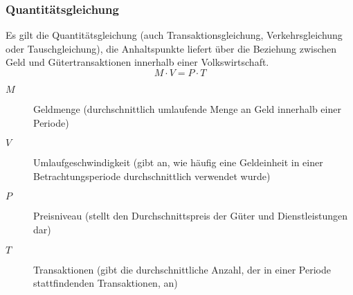 \subsubsection{Quantitätsgleichung}
Es gilt die Quantitätsgleichung (auch Transaktionsgleichung, Verkehrsgleichung oder Tauschgleichung), die Anhaltspunkte liefert 
über die Beziehung zwischen Geld und Gütertransaktionen innerhalb einer Volkswirtschaft.
\begin{equation*}
	M \cdot V = P \cdot T
\end{equation*}
\begin{description}
	\item [$M$] Geldmenge (durchschnittlich umlaufende Menge an Geld innerhalb einer Periode)
	\item [$V$] Umlaufgeschwindigkeit (gibt an, wie häufig eine Geldeinheit in einer Betrachtungsperiode durchschnittlich verwendet wurde)
	\item [$P$] Preisniveau (stellt den Durchschnittspreis der Güter und Dienstleistungen dar)
	\item [$T$] Transaktionen (gibt die durchschnittliche Anzahl, der in einer Periode stattfindenden Transaktionen, an) 
\end{description}
